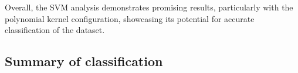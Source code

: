 \documentclass[11pt,a4paper]{article}\usepackage[]{graphicx}\usepackage[]{xcolor}
\begin{document}
\begin{itemize}
Overall, the SVM analysis demonstrates promising results, particularly with the polynomial kernel configuration, showcasing its potential for accurate classification of the dataset.
    \end{itemize}
  
  
	 	\subsection{Summary of classification}
	 	
\end{document}
